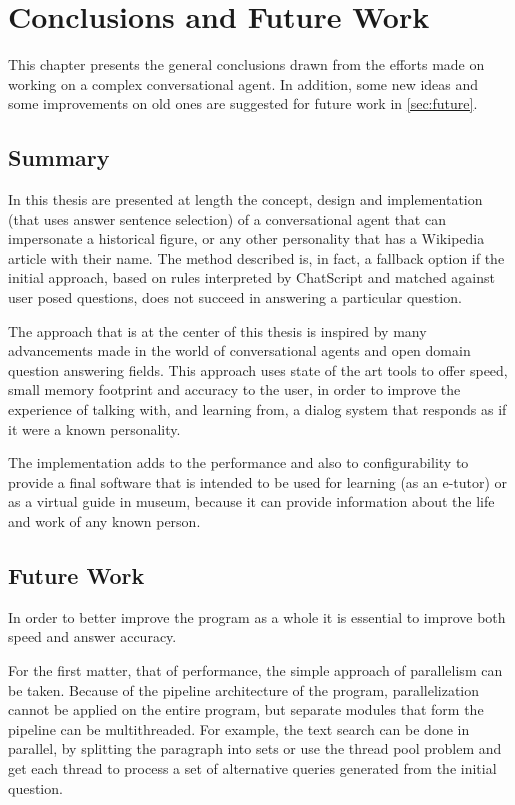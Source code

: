 \chapter{Conclusions and Future Work}
\label{chapter:conclusions}

This chapter presents the general conclusions drawn from the efforts made on working on a complex conversational agent. In addition, some new ideas and some improvements on old ones are suggested for future work in \autoref{sec:future}.

\section{Summary}
\label{sec:conclusions-summary}

In this thesis are presented at length the concept, design and implementation (that uses answer sentence selection) of a conversational agent that can impersonate a historical figure, or any other personality that has a Wikipedia article with their name. The method described is, in fact, a fallback option if the initial approach, based on rules interpreted by ChatScript and matched against user posed questions, does not succeed in answering a particular question.

The approach that is at the center of this thesis is inspired by many advancements made in the world of conversational agents and open domain question answering fields. This approach uses state of the art tools to offer speed, small memory footprint and accuracy to the user, in order to improve the experience of talking with, and learning from, a dialog system that responds as if it were a known personality.

The implementation adds to the performance and also to configurability to provide a final software that is intended to be used for learning (as an e-tutor) or as a virtual guide in museum, because it can provide information about the life and work of any known person.

\section{Future Work}
\label{sec:future}

In order to better improve the program as a whole it is essential to improve both speed and answer accuracy.

For the first matter, that of performance, the simple approach of parallelism can be taken. Because of the pipeline architecture of the program, parallelization cannot be applied on the entire program, but separate modules that form the pipeline can be multithreaded. For example, the text search can be done in parallel, by splitting the paragraph into sets or use the thread pool problem and get each thread to process a set of alternative queries generated from the initial question.

